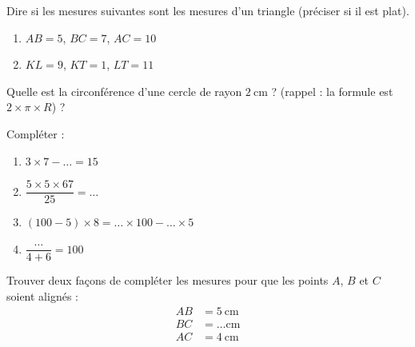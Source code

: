 \begin{MentalActivity}

    \begin{mental}
        Dire si les mesures suivantes sont les mesures d'un triangle (préciser si il est plat).
        \begin{enumerate}
            \item
                \( AB=5\), \( BC=7\), \( AC=10\)
            \item
                \( KL=9\), \( KT=1\),  \( LT=11\)
        \end{enumerate}
    \end{mental}

    \begin{mental}
        Quelle est la circonférence d'une cercle de rayon \( \SI{2}{\centi\meter}\) ? (rappel : la formule est \( 2\times\pi\times R\)) ?
    \end{mental}

    \begin{mental}
        Compléter :
        \begin{enumerate}
            \item
                \( 3\times 7-\ldots=15\)
            \item
                \( \dfrac{ 5\times 5\times 67 }{ 25 }=\ldots\)
            \item
                \( (100-5)\times 8=\ldots\times 100-\ldots\times 5\)
            \item
                \( \dfrac{ \ldots }{ 4+6 }=100\)
        \end{enumerate}
    \end{mental}

    \begin{mental}
        Trouver deux façons de compléter les mesures pour que les points \( A\), \( B\) et \( C\) soient alignés :
        \begin{subequations}
            \begin{align}
                AB&=\SI{5}{\centi\meter}\\
                BC&=\ldots\si{\centi\meter}\\
                AC&=\SI{4}{\centi\meter}
            \end{align}
        \end{subequations}
    \end{mental}
\end{MentalActivity}

